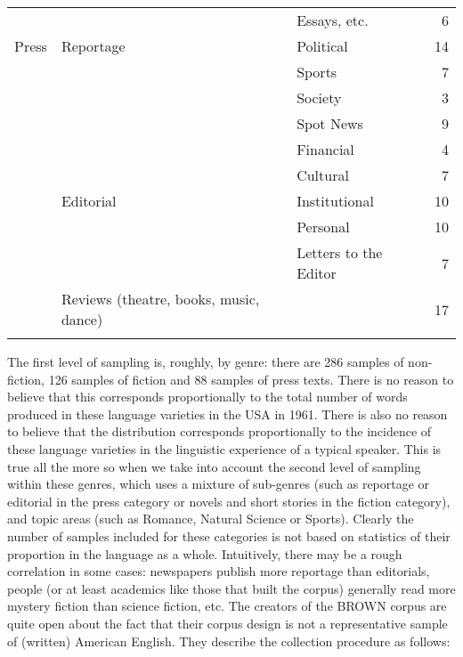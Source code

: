 \begin{table}
{\begin{tabular}{lllr}
 & & Essays, etc. & 6 \\
Press & Reportage & Political & 14 \\
 & & Sports & 7 \\
 & & Society & 3 \\
 & & Spot News & 9 \\
 & & Financial & 4 \\
 & & Cultural & 7 \\
 & Editorial & Institutional & 10 \\
 & & Personal & 10 \\
 & & Letters to the Editor & 7 \\
 & Reviews (theatre, books, music, dance) & & 17 \\
 \lspbottomrule
 \end{tabular}}
\end{table}

The first level of sampling  is, roughly, by genre:  there are 286 samples of non\hyp{}fiction, 126 samples of fiction  and 88 samples of press texts. There is no reason to believe that this corresponds proportionally to the total number of words produced in these language varieties  in the USA in 1961. There is also no reason to believe that the distribution corresponds proportionally to the incidence of these language varieties in the linguistic experience of a typical speaker. This is true all the more so when we take into account the second level of sampling within these genres,  which uses a mixture of sub\hyp{}genres (such as reportage  or editorial in the press category or novels and short stories in the fiction category), and topic areas (such as Romance, Natural Science or Sports). Clearly the number of samples  included for these categories  is not based on statistics of their proportion in the language as a whole. Intuitively, there may be a rough correlation in some cases: newspapers publish more reportage than editorials, people (or at least academics like those that built the corpus) generally read more mystery fiction  than science fiction, etc. The creators of the BROWN  corpus are quite open about the fact that their corpus design  is not a representative  sample of (written)  American  English. They describe the collection procedure as follows:

